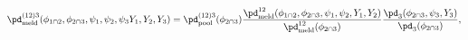 \begin{equation}
  \pd_{\text{meld}}^{(12)3}(\phi_{1 \cap 2}, \phi_{2 \cap 3}, \psi_{1}, \psi_{2}, \psi_{3} Y_{1}, Y_{2}, Y_{3}) =
    \pd_{\text{pool}}^{(12)3}(\phi_{2 \cap 3})
    \frac{
      \pd_{\text{meld}}^{12}(\phi_{1 \cap 2}, \phi_{2 \cap 3}, \psi_{1}, \psi_{2}, Y_{1}, Y_{2})
    } {
      \pd_{\text{meld}}^{12}(\phi_{2 \cap 3})
    }
    \frac{
      \pd_{3}(\phi_{2 \cap 3}, \psi_{3}, Y_{3})
    } {
      \pd_{3}(\phi_{2 \cap 3})
    },
  \label{eqn:double-melded-model}
\end{equation}